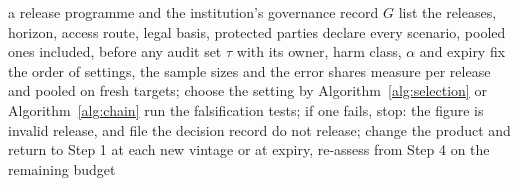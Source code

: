 \begin{algorithm}[t]
\caption{Assessing a release programme}\label{alg:protocol}
\begin{algorithmic}[1]
\Require a release programme and the institution's governance record $G$
\State list the releases, horizon, access route, legal basis, protected parties 
\State declare every scenario, pooled ones included, before any audit 
\State set $\tau$ with its owner, harm class, $\alpha$ and expiry 
\State fix the order of settings, the sample sizes and the error shares 
\State measure per release and pooled on fresh targets; choose the setting by
  Algorithm~\ref{alg:selection} or Algorithm~\ref{alg:chain} 
\State run the falsification tests; if one fails, stop: the figure is invalid 
  \State release, and file the decision record 
\Else
  \State do not release; change the product and return to Step 1
\EndIf
\State at each new vintage or at expiry, re-assess from Step 4 on the remaining budget
\end{algorithmic}
\end{algorithm}
